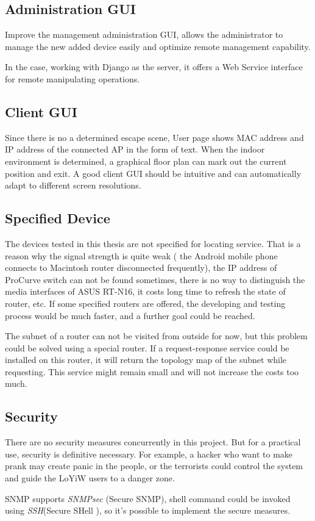 \subsection{Administration GUI}

Improve the management administration GUI, allows the administrator to manage the new added device easily and optimize remote management capability.

In the case, working with Django as the server, it offers a Web Service interface for remote manipulating operations.

\subsection{Client GUI}

Since there is no a determined escape scene, User page shows MAC address and IP address of the connected AP in the form of text. When the indoor environment is determined, a graphical floor plan can mark out the current position and exit. A good client GUI should be intuitive and can automatically adapt to different screen resolutions.

\subsection{Specified Device}
The devices tested in this thesis are not specified for locating service. That is a reason why the signal strength is quite weak ( the Android mobile phone connects to Macintosh router disconnected frequently), the IP address of ProCurve switch can not be found sometimes, there is no way to distinguish the media interfaces of ASUS RT-N16, it costs long time to refresh the state of router, etc. If some specified routers are offered, the developing and testing process would be much faster, and a further goal could be reached.

The subnet of a router can not be visited from outside for now, but this problem could be solved using a special router. If a request-response service could be installed on this router, it will return the topology map of the subnet while requesting. This service might remain small and will not increase the costs too much. 

\subsection{Security}

There are no security measures concurrently in this project. But for a practical use, security is definitive necessary. For example, a hacker who want to make prank may create panic in the people, or the terrorists could control the system and guide the LoYiW users to a danger zone.

SNMP supports \textit{SNMPsec} (Secure SNMP), shell command could be invoked using \textit{SSH}(Secure SHell ), so it's possible to implement the secure measures.